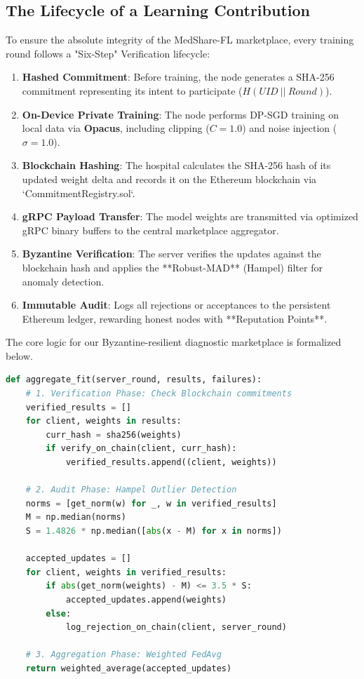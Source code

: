 \documentclass[10pt, a4paper, twocolumn]{article}
\begin{document}
\subsection{The Lifecycle of a Learning Contribution}
To ensure the absolute integrity of the MedShare-FL marketplace, every training round follows a "Six-Step" Verification lifecycle:
\begin{enumerate}
    \item \textbf{Hashed Commitment}: Before training, the node generates a SHA-256 commitment representing its intent to participate ($H(UID \ || \ Round)$).
    \item \textbf{On-Device Private Training}: The node performs DP-SGD training on local data via \textbf{Opacus}, including clipping ($C=1.0$) and noise injection ($\sigma=1.0$).
    \item \textbf{Blockchain Hashing}: The hospital calculates the SHA-256 hash of its updated weight delta and records it on the Ethereum blockchain via `CommitmentRegistry.sol`.
    \item \textbf{gRPC Payload Transfer}: The model weights are transmitted via optimized gRPC binary buffers to the central marketplace aggregator.
    \item \textbf{Byzantine Verification}: The server verifies the updates against the blockchain hash and applies the **Robust-MAD** (Hampel) filter for anomaly detection.
    \item \textbf{Immutable Audit}: Logs all rejections or acceptances to the persistent Ethereum ledger, rewarding honest nodes with **Reputation Points**.
\end{enumerate}

The core logic for our Byzantine-resilient diagnostic marketplace is formalized below.

\begin{lstlisting}[language=Python, caption={MedShare-FL Aggregation Algorithm}]
def aggregate_fit(server_round, results, failures):
    # 1. Verification Phase: Check Blockchain commitments
    verified_results = []
    for client, weights in results:
        curr_hash = sha256(weights)
        if verify_on_chain(client, curr_hash):
            verified_results.append((client, weights))
    
    # 2. Audit Phase: Hampel Outlier Detection
    norms = [get_norm(w) for _, w in verified_results]
    M = np.median(norms)
    S = 1.4826 * np.median([abs(x - M) for x in norms])
    
    accepted_updates = []
    for client, weights in verified_results:
        if abs(get_norm(weights) - M) <= 3.5 * S:
            accepted_updates.append(weights)
        else:
            log_rejection_on_chain(client, server_round)
            
    # 3. Aggregation Phase: Weighted FedAvg
    return weighted_average(accepted_updates)
\end{lstlisting}
\end{document}
